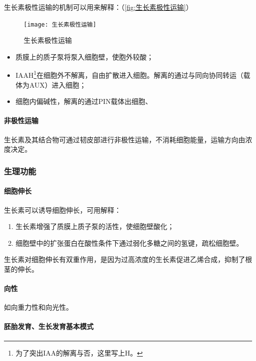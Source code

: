 生长素极性运输的机制可以用来解释：（\autoref{fig:生长素极性运输}）

\begin{figure}[htbp]
	\centering
	\texttt{[image: 生长素极性运输]}
	\caption{生长素极性运输}
	\label{fig:生长素极性运输}
\end{figure}

\begin{itemize}
	\item 质膜上的质子泵将泵入细胞壁，使胞外较酸；
	\item IAAH\footnote{为了突出IAA的解离与否，这里写上H。}在细胞外不解离，自由扩散进入细胞。解离的通过与同向协同转运（载体为AUX）进入细胞；
	\item 细胞内偏碱性，解离的通过PIN载体出细胞、
\end{itemize}

\paragraph{非极性运输}

生长素及其结合物可通过韧皮部进行非极性运输，不消耗细胞能量，运输方向由浓度决定。

\subsubsection{生理功能}

\paragraph{细胞伸长}

生长素可以诱导细胞伸长，可用解释：

\begin{enumerate}
	\item 生长素增强了质膜上质子泵的活性，使细胞壁酸化；
	\item 细胞壁中的扩张蛋白在酸性条件下通过弱化多糖之间的氢键，疏松细胞壁。
\end{enumerate}

生长素对细胞伸长有双重作用，是因为过高浓度的生长素促进乙烯合成，抑制了根茎的伸长。

\paragraph{向性}

如向重力性和向光性。

\paragraph{胚胎发育、生长发育基本模式}

